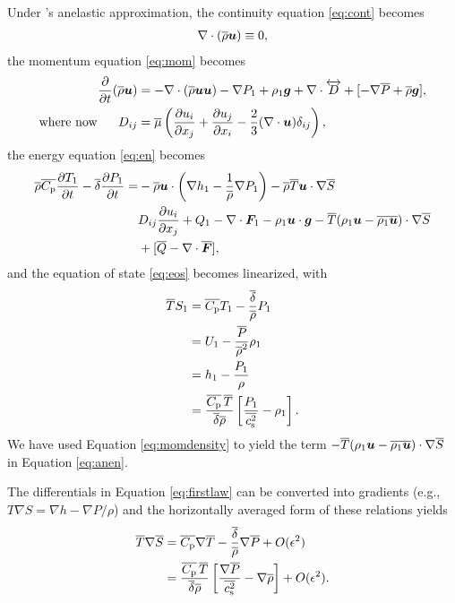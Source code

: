 \documentclass[12pt]{article}
\newcommand{\vecf}{\bm{F}}
\begin{document}
	Under \citet{Gough1969}'s anelastic approximation, the continuity equation \eqref{eq:cont} becomes
	\begin{align}\label{eq:ancont}
		\nabla\cdot(\overline{\rho}\bm{u})\equiv 0,
	\end{align}
	the momentum equation \eqref{eq:mom} becomes 
	\begin{subequations}\label{eq:anmom}
	\begin{align}
		\frac{\partial}{\partial t}(\overline{\rho}\bm{u})&=-\nabla\cdot(\overline{\rho}\bm{u}\bm{u}) - \nabla P_1 +\rho_1\bm{g} +\nabla\cdot \overleftrightarrow{D}+[-\nabla\overline{P} + \overline{\rho}\bm{g}],\label{eq:anmommain}\\
		\text{where now}\ \ \ \ \  D_{ij}& = \overline{\mu}\left(\frac{\partial u_i}{\partial x_j} + \frac{\partial u_j}{\partial x_i} - \frac{2}{3}(\nabla\cdot\bm{u})\delta_{ij}\right)\label{eq:anmomvisc},
	\end{align}
	\end{subequations}
	the energy equation \eqref{eq:en} becomes 
	\begin{align}\label{eq:anen}
		\rhoover\cpover\pderiv{\tmpone}{t} - \deltaover\pderiv{\prsone}{t} = &-\rhoover\vecu\cdot\left(\nabla \enthone-\frac{1}{\rhoover}\nabla \prsone\right) - \rhoover \tmpover \ugrad \entrover\nonumber\\
		& D_{ij}\pderiv{u_i}{x_j} + Q _1- \Div\vecf_1 -\rhoone\vecu\cdot\vecg - \tmpover(\rhoone\vecu-\overline{\rhoone\vecu})\cdot\nabla\entrover\nonumber\\
		&+ [\heatover - \Div\overline{\vecf}],
	\end{align}
  and the equation of state \eqref{eq:eos} becomes linearized, with
  \begin{subequations}\label{eq:aneos}
  \begin{align}
  	\overline{T} S_1 &= \overline{C_{\rm{p}}} T_1 - \frac{\overline{\delta}}{\overline{\rho}} P_1\label{eq:lintp}\\
  	&= U_1 - \frac{\overline{P}}{\overline{\rho}^2}\rho_1 \label{eq:linu}\\
  	&= h_1 - \frac{P_1}{\rho}\\
  	&= \frac{\overline{C_{\rm{p}}}\, \overline{T}}{\overline{\delta}\overline{\rho}}\left[\frac{P_1}{\overline{c_{\rm s}^2}}-\rho_1\right].
  \end{align}
  \end{subequations}
  We have used Equation \eqref{eq:momdensity} to yield the term $- \overline{T}(\rho_1\bm{u}-\overline{\rho_1\bm{u}})\cdot\nabla\overline{S}$ in Equation \eqref{eq:anen}. 
  
   The differentials in Equation \eqref{eq:firstlaw} can be converted into gradients (e.g., $T\nabla S= \nabla h - \nabla P/\rho$) and the horizontally averaged form of these relations yields 
  \begin{subequations}\label{eq:anfirstlaw}
  	\begin{align}
  		\overline{T}\nabla\overline{S} &= \overline{C_{\rm{p}}}\nabla\overline{T} - \frac{\overline{\delta}}{\overline{\rho}}\nabla\overline{P} + O(\epsilon^2)\\
  		&= \frac{\overline{C_{\rm{p}}}\,\overline{T}}{\overline{\delta}\overline{\rho}}\left[\frac{\nabla\overline{P}}{\overline{c_{\rm s}^2}}-\nabla\overline{\rho}\right]+O(\epsilon^2).
  	\end{align}
  \end{subequations}
  
\end{document}
